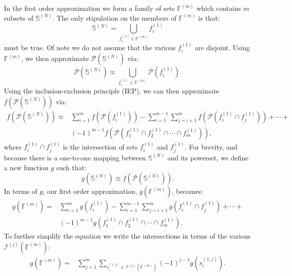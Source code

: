 \documentclass[11pt]{article}
\newcommand{\fxn}[1]{f\left(#1\right)}
\newcommand{\gxn}[1]{g\left(#1\right)}
\newcommand{\pset}[1]{\mathcal{P}\left(#1\right)}
\newcommand{\mcn}[2]{\mathcal{U}^{(#1)}\left(#2\right)}
\newcommand{\ints}[2]{\mathcal{I}^{(#1)}\left(#2\right)}
\newcommand{\setf}{\mathbb{F}}
\newcommand{\fmem}[2]{f^{\left(#1\right)}_{#2}}
\newcommand{\smem}[2]{s^{\left(#1\right)}_{#2}}
\newcommand{\setfn}[1]{\setf^{(#1)}}
\newcommand{\sets}{\mathbb{S}^{(N)}}
\newcommand{\fxns}{\fxn{\pset{\sets}}}
\newcommand{\gapprox}[1]{g\left(#1\right)}
\begin{document}
In the first order approximation we form a family of sets $\setfn{m}$ which
contains $m$ subsets of $\sets$. The only stipulation on the members of
$\setfn{m}$ is that:
\begin{equation}
    \sets = \bigcup_{\fmem{1}{i}\in\setfn{m}} \fmem{1}{i}
\end{equation}
must be true. Of note we do not assume that the various $\fmem{1}{i}$ are
disjoint. Using $\setfn{m}$, we then approximate $\pset{\sets}$ via:
\begin{equation}
	\pset{\sets} \approx
      \bigcup_{\fmem{1}{i}\in \setfn{m}} \pset{\fmem{1}{i}}.
\end{equation}
Using the inclusion-exclusion principle (IEP), we can then approximate $\fxns$
via:
\begin{align}
	\fxn{\pset{\sets}} \approx&
        \sum_{i=1}^m \fxn{\pset{\fmem{1}{i}}} -
        \sum_{i=1}^{m-1}\sum_{j=i+1}^{m}
          \fxn{\pset{\fmem{1}{i}\cap\fmem{1}{j}}} + \cdots +\nonumber\\
      & \left(-1\right)^{m-1}
          \fxn{\pset{\fmem{1}{1}\cap\fmem{1}{2}\cap\cdots\cap\fmem{1}{m}}},
\end{align}
where $\fmem{1}{i}\cap \fmem{1}{j}$ is the intersection of sets $\fmem{1}{i}$
and $\fmem{1}{j}$. For brevity, and because there is a one-to-one mapping
between $\sets$ and its powerset, we define a new function $g$ such that:
\begin{equation}
	\gxn{\sets} \equiv \fxn{\pset{\sets}}.
\end{equation}
In terms of $g$, our first order approximation, $\gapprox{\setfn{m}}$, becomes:
\begin{align}
	\gapprox{\setfn{m}} =&
        \sum_{i=1}^m \gxn{\fmem{1}{i}} -
	    \sum_{i=1}^{m-1}\sum_{j=i+1}^{m}
	      \gxn{\fmem{1}{i}\cap\fmem{1}{j}} + \cdots +\nonumber\\
	  & \left(-1\right)^{m-1}
        \gxn{\fmem{1}{1}\cap\fmem{1}{2}\cap\cdots\cap\fmem{1}{m}}.
\end{align}
To further simplify the equation we write the intersections in terms of the
various $\ints{j}{\setfn{m}}$:
\begin{align}
    \gapprox{\setfn{m}} =&
        \sum_{j=1}^m\sum_{\smem{1,j}{i}\in\ints{j}{\setfn{m}}}
        \left(-1\right)^{j-1}\gxn{\smem{1,j}{i}}.\label{eq:order1}
\end{align}

\newcommand{\dimers}{\mcn{2}{\setfn{m}}}
\newcommand{\lmers}{\mcn{\ell}{\setfn{m}}}
\end{document}
